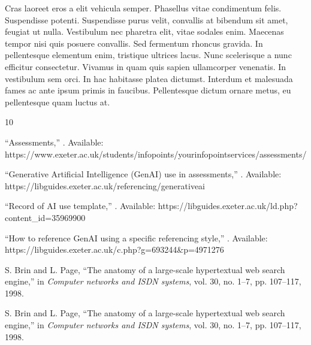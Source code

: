 \documentclass[11pt,a4paper]{article}
\begin{document}
Cras laoreet eros a elit vehicula semper. Phasellus vitae condimentum felis. Suspendisse potenti. Suspendisse purus velit, convallis at bibendum sit amet, feugiat ut nulla. Vestibulum nec pharetra elit, vitae sodales enim. Maecenas tempor nisi quis posuere convallis. Sed fermentum rhoncus gravida. In pellentesque elementum enim, tristique ultrices lacus. Nunc scelerisque a nunc efficitur consectetur. Vivamus in quam quis sapien ullamcorper venenatis. In vestibulum sem orci. In hac habitasse platea dictumst. Interdum et malesuada fames ac ante ipsum primis in faucibus. Pellentesque dictum ornare metus, eu pellentesque quam luctus at. 

\newpage
%
%
%
% 
% 

\newcommand{\bibspace}[0]{\vspace*{-.1cm}}
\begin{thebibliography}{10}

``Assessments,'' 
. 
Available: https://www.exeter.ac.uk/students/infopoints/yourinfopointservices/assessments/

\bibspace

``Generative Artificial Intelligence (GenAI) use in assessments,'' 
. 
Available: https://libguides.exeter.ac.uk/referencing/generativeai

\bibspace

``Record of AI use template,'' 
. 
Available: https://libguides.exeter.ac.uk/ld.php?content\_id=35969900

\bibspace

``How to reference GenAI using a specific referencing style,'' 
. 
Available: https://libguides.exeter.ac.uk/c.php?g=693244\&p=4971276

\bibspace

S. Brin and L. Page, 
\newblock ``{The anatomy of a large-scale hypertextual web search engine},''
\newblock in {\em Computer networks and ISDN systems}, vol. 30, no. 1--7, pp. 107--117, 1998.

\bibspace

S. Brin and L. Page, 
\newblock ``{The anatomy of a large-scale hypertextual web search engine},''
\newblock in {\em Computer networks and ISDN systems}, vol. 30, no. 1--7, pp. 107--117, 1998.
\end{thebibliography}
\end{document}
